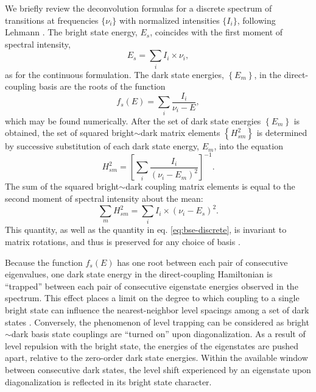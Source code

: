 We briefly review the deconvolution formulas for a discrete spectrum
of transitions at frequencies $\lbrace \nu_i \rbrace$ with normalized
intensities $\lbrace I_i \rbrace$, following Lehmann \cite{lehmann91}.
The bright state energy, $E_s$, coincides with the first moment of
spectral intensity,
\begin{equation}
  \label{eq:bse-discrete}
  E_s = \sum_i I_i \times \nu_i,
\end{equation}
as for the continuous formulation.  The dark state energies, $\left
  \lbrace E_m \right \rbrace$, in the direct-coupling basis are the
roots of the function
\begin{equation}
  f_s(E) = \sum_i \frac{I_i}{\nu_i - E},
\end{equation}
which may be found numerically.  After the set of dark state energies
$\left \lbrace E_m \right \rbrace$ is obtained, the set of squared
bright$\sim$dark matrix elements $\left \lbrace H_{sm}^2 \right
\rbrace$ is determined by successive substitution of each dark state
energy, $E_m$, into the equation
\begin{equation}
  H_{sm}^2 = 
  \left [
    \sum_i \frac{I_i}{(\nu_i - E_m)^2}
  \right ]^{-1}.
\end{equation}
The sum of the squared bright$\sim$dark coupling matrix elements is
equal to the second moment of spectral intensity about the mean:
\begin{equation}
  \label{eq:me-sum-discrete}
  \sum_m H_{sm}^2 = \sum_i I_i \times (\nu_i - E_s)^2.
\end{equation}
This quantity, as well as the quantity in eq. \ref{eq:bse-discrete},
is invariant to matrix rotations, and thus is preserved for any choice
of basis \cite{lehmann91}.

Because the function $f_s(E)$ has one root between each pair of
consecutive eigenvalues, one dark state energy in the direct-coupling
Hamiltonian is ``trapped'' between each pair of consecutive eigenstate
energies observed in the spectrum.  This effect places a limit on the
degree to which coupling to a single bright state can influence the
nearest-neighbor level spacings among a set of dark states
\cite{coy87}.  Conversely, the phenomenon of level trapping can be
considered as bright$\sim$dark basis state couplings are ``turned on''
upon diagonalization.  As a result of level repulsion with the bright
state, the energies of the eigenstates are pushed apart, relative to
the zero-order dark state energies.  Within the available window
between consecutive dark states, the level shift experienced by an
eigenstate upon diagonalization is reflected in its bright state
character.  

